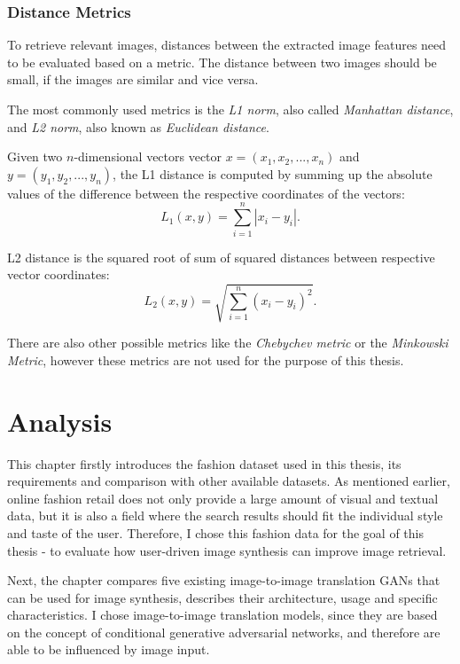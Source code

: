 \documentclass[12pt]{report}
\begin{document}
\pagebreak
\subsection{Distance Metrics}
To retrieve relevant images, distances between the extracted image features need to be evaluated based on a metric. The distance between two images should be small, if the images are similar and vice versa. 

The most commonly used metrics is the \textit{L1 norm}, also called \textit{Manhattan distance}, and \textit{L2 norm}, also known as \textit{Euclidean distance}.

Given two $n$-dimensional vectors vector $x = (x_1, x_2, ..., x_n)$ and $y = (y_1, y_2, ..., y_n)$, the L1 distance is computed by summing up the absolute values of the difference between the respective coordinates of the vectors:
\begin{equation}
L_1(x, y) = \sum_{i=1}^{n} |x_i - y_i|.
\end{equation} 

L2 distance is the squared root of sum of squared distances between respective vector coordinates:
\begin{equation}
L_2(x, y) = \sqrt{\sum_{i=1}^{n} (x_i - y_i)^2}.
\end{equation}

There are also other possible metrics like the \textit{Chebychev metric} or the \textit{Minkowski Metric}, however these metrics are not used for the purpose of this thesis. 


\pagebreak
\chapter{Analysis}
This chapter firstly introduces the fashion dataset used in this thesis, its requirements and comparison with other available datasets. As mentioned earlier, online fashion retail does not only provide a large amount of visual and textual data, but it is also a field where the search results should fit the individual style and taste of the user. Therefore, I chose this fashion data for the goal of this thesis - to evaluate how user-driven image synthesis can improve image retrieval.

Next, the chapter compares five existing image-to-image translation GANs that can be used for image synthesis, describes their architecture, usage and specific characteristics. I chose image-to-image translation models, since they are based on the concept of conditional generative adversarial networks, and therefore are able to be influenced by image input.
\end{document}
